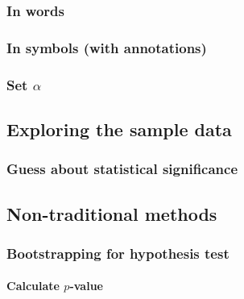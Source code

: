 \documentclass[12pt, krantz2,]{krantz}
\let\oldparagraph\paragraph
\renewcommand{\paragraph}[1]{\oldparagraph{#1}\mbox{}}
\begin{document}
\hypertarget{in-words}{%
\subsubsection*{In words}\label{in-words}}


\hypertarget{in-symbols-with-annotations}{%
\subsubsection*{In symbols (with annotations)}\label{in-symbols-with-annotations}}


\hypertarget{set-alpha}{%
\subsubsection*{\texorpdfstring{Set \(\alpha\)}{Set \textbackslash{}alpha}}\label{set-alpha}}


\hypertarget{exploring-the-sample-data}{%
\subsection{Exploring the sample data}\label{exploring-the-sample-data}}

\hypertarget{guess-about-statistical-significance}{%
\subsubsection*{Guess about statistical significance}\label{guess-about-statistical-significance}}


\hypertarget{non-traditional-methods}{%
\subsection{Non-traditional methods}\label{non-traditional-methods}}

\hypertarget{bootstrapping-for-hypothesis-test}{%
\subsubsection*{Bootstrapping for hypothesis test}\label{bootstrapping-for-hypothesis-test}}


\hypertarget{calculate-p-value}{%
\paragraph{\texorpdfstring{Calculate \(p\)-value}{Calculate p-value}}\label{calculate-p-value}}
\end{document}
